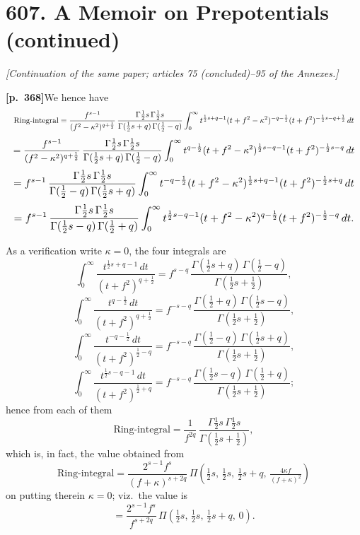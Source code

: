 \documentclass[11pt]{article}
\begin{document}
\section*{\textbf{607.} A Memoir on Prepotentials (continued)}

\textit{[Continuation of the same paper; articles 75 (concluded)--95 of the Annexes.]}

\bigskip

\noindent\textbf{[p.~368]}\quad We hence have
\[
\resizebox{\textwidth}{!}{$\displaystyle
\text{Ring-integral}
= \frac{f^{s-1}}{(f^{2}-\kappa^{2})^{q+\frac{1}{2}}}\,\frac{\Gamma\tfrac{1}{2}s\,\Gamma\tfrac{1}{2}s}{\Gamma(\tfrac{1}{2}s+q)\,\Gamma(\tfrac{1}{2}-q)}\int_{0}^{\infty} t^{\frac{1}{2}s+q-1}(t+f^{2}-\kappa^{2})^{-q-\frac{1}{2}}(t+f^{2})^{-\frac{1}{2}s-q+\frac{1}{2}}\,dt$}
\]
\[
\resizebox{\textwidth}{!}{$\displaystyle
= \frac{f^{s-1}}{(f^{2}-\kappa^{2})^{q+\frac{1}{2}}}\,\frac{\Gamma\tfrac{1}{2}s\,\Gamma\tfrac{1}{2}s}{\Gamma(\tfrac{1}{2}s+q)\,\Gamma(\tfrac{1}{2}-q)}\int_{0}^{\infty} t^{q-\frac{1}{2}}(t+f^{2}-\kappa^{2})^{\frac{1}{2}s-q-1}(t+f^{2})^{-\frac{1}{2}s-q}\,dt$}
\]
\[
\resizebox{\textwidth}{!}{$\displaystyle
= f^{s-1}\,\frac{\Gamma\tfrac{1}{2}s\,\Gamma\tfrac{1}{2}s}{\Gamma(\tfrac{1}{2}-q)\,\Gamma(\tfrac{1}{2}s+q)}\int_{0}^{\infty} t^{-q-\frac{1}{2}}(t+f^{2}-\kappa^{2})^{\frac{1}{2}s+q-1}(t+f^{2})^{-\frac{1}{2}s+q}\,dt$}
\]
\[
\resizebox{\textwidth}{!}{$\displaystyle
= f^{s-1}\,\frac{\Gamma\tfrac{1}{2}s\,\Gamma\tfrac{1}{2}s}{\Gamma(\tfrac{1}{2}s-q)\,\Gamma(\tfrac{1}{2}+q)}\int_{0}^{\infty} t^{\frac{1}{2}s-q-1}(t+f^{2}-\kappa^{2})^{q-\frac{1}{2}}(t+f^{2})^{-\frac{1}{2}-q}\,dt.$}
\]

As a verification write $\kappa=0$, the four integrals are
\[
\int_{0}^{\infty}\frac{t^{\frac{1}{2}s+q-1}\,dt}{(t+f^{2})^{q+\frac{1}{2}}} = f^{s-q}\,\frac{\Gamma(\tfrac{1}{2}s+q)\,\Gamma(\tfrac{1}{2}-q)}{\Gamma(\tfrac{1}{2}s+\tfrac{1}{2})},
\]
\[
\int_{0}^{\infty}\frac{t^{q-\frac{1}{2}}\,dt}{(t+f^{2})^{q+\frac{1}{2}}} = f^{-s-q}\,\frac{\Gamma(\tfrac{1}{2}+q)\,\Gamma(\tfrac{1}{2}s-q)}{\Gamma(\tfrac{1}{2}s+\tfrac{1}{2})},
\]
\[
\int_{0}^{\infty}\frac{t^{-q-\frac{1}{2}}\,dt}{(t+f^{2})^{\frac{1}{2}-q}} = f^{-s-q}\,\frac{\Gamma(\tfrac{1}{2}-q)\,\Gamma(\tfrac{1}{2}s+q)}{\Gamma(\tfrac{1}{2}s+\tfrac{1}{2})},
\]
\[
\int_{0}^{\infty}\frac{t^{\frac{1}{2}s-q-1}\,dt}{(t+f^{2})^{\frac{1}{2}+q}} = f^{-s-q}\,\frac{\Gamma(\tfrac{1}{2}s-q)\,\Gamma(\tfrac{1}{2}+q)}{\Gamma(\tfrac{1}{2}s+\tfrac{1}{2})};
\]
hence from each of them
\[
\text{Ring-integral} = \frac{1}{f^{2q}}\,\frac{\Gamma\tfrac{1}{2}s\,\Gamma\tfrac{1}{2}s}{\Gamma(\tfrac{1}{2}s+\tfrac{1}{2})},
\]
which is, in fact, the value obtained from
\[
\text{Ring-integral} = \frac{2^{s-1}f^{s}}{(f+\kappa)^{s+2q}}\,\Pi\!\left(\tfrac{1}{2}s,\,\tfrac{1}{2}s,\,\tfrac{1}{2}s+q,\,\tfrac{4\kappa f}{(f+\kappa)^{2}}\right)
\]
on putting therein $\kappa=0$; viz.\ the value is
\[
= \frac{2^{s-1}f^{s}}{f^{s+2q}}\,\Pi(\tfrac{1}{2}s,\,\tfrac{1}{2}s,\,\tfrac{1}{2}s+q,\,0).
\]
\end{document}
